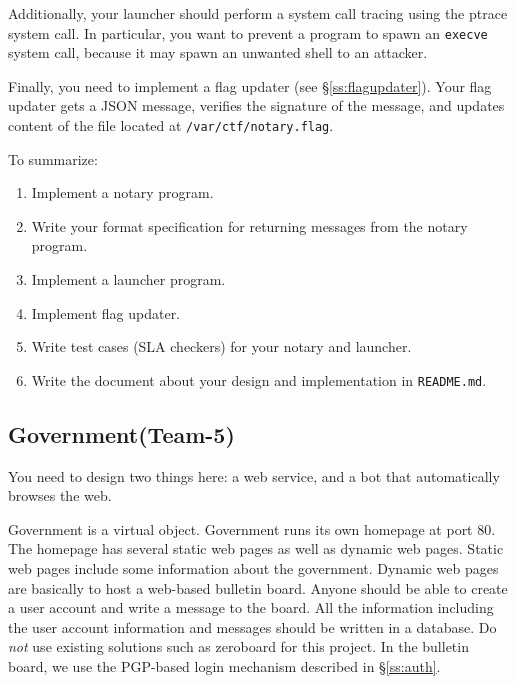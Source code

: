 \documentclass[a4paper, 11pt]{article}
\newcommand*{\Modfive}{Government\xspace}%
\theoremstyle{definition}
\begin{document}
{Additionally, your launcher should perform a system call tracing using
the ptrace system call. In particular, you want to prevent a program
to spawn an \texttt{execve} system call, because it may spawn an
unwanted shell to an attacker.

Finally, you need to implement a flag updater (see
\S\ref{ss:flagupdater}). Your flag updater gets a JSON message,
verifies the signature of the message, and updates content of the file
located at \texttt{/var/ctf/notary.flag}.

To summarize:
\begin{enumerate}

  \item Implement a notary program.

  \item Write your format specification for returning messages from
    the notary program.

  \item Implement a launcher program.

  \item Implement flag updater.

  \item Write test cases (SLA checkers) for your notary and launcher.

  \item Write the document about your design and implementation in
    \texttt{README.md}.

\end{enumerate}

\subsection{\Modfive (Team-5)}

You need to design two things here: a web service, and a bot that
automatically browses the web.

Government is a virtual object. Government runs its own homepage at
port 80. The homepage has several static web pages as well as dynamic
web pages. Static web pages include some information about the
government. Dynamic web pages are basically to host a web-based
bulletin board. Anyone should be able to create a user account and
write a message to the board. All the information including the user
account information and messages should be written in a database. Do
\emph{not} use existing solutions such as zeroboard for this project.
In the bulletin board, we use the PGP-based login mechanism described
in \S\ref{ss:auth}.

}
\end{document}
